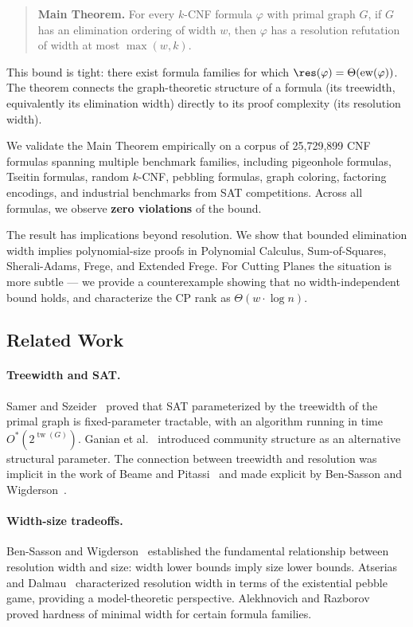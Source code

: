 \documentclass[11pt]{article}
\DeclareMathOperator{\tw}{tw}
\DeclareMathOperator{\ew}{ew}
\begin{document}
\begin{quote}
\textbf{Main Theorem.} For every $k$-CNF formula $\varphi$ with primal graph $G$, if $G$ has an elimination ordering of width $w$, then $\varphi$ has a resolution refutation of width at most $\max(w,k)$.
\end{quote}

This bound is tight: there exist formula families for which $\res(\varphi) = \Theta(\ew(\varphi))$. The theorem connects the graph-theoretic structure of a formula (its treewidth, equivalently its elimination width) directly to its proof complexity (its resolution width).

We validate the Main Theorem empirically on a corpus of 25{,}729{,}899 CNF formulas spanning multiple benchmark families, including pigeonhole formulas, Tseitin formulas, random $k$-CNF, pebbling formulas, graph coloring, factoring encodings, and industrial benchmarks from SAT competitions. Across all formulas, we observe \textbf{zero violations} of the bound.

The result has implications beyond resolution. We show that bounded elimination width implies polynomial-size proofs in Polynomial Calculus, Sum-of-Squares, Sherali-Adams, Frege, and Extended Frege. For Cutting Planes the situation is more subtle --- we provide a counterexample showing that no width-independent bound holds, and characterize the CP rank as $\Theta(w \cdot \log n)$.

\subsection{Related Work}

\paragraph{Treewidth and SAT.} Samer and Szeider~\cite{SS10} proved that SAT parameterized by the treewidth of the primal graph is fixed-parameter tractable, with an algorithm running in time $O^*(2^{\tw(G)})$. Ganian et al.~\cite{ganian2017community} introduced community structure as an alternative structural parameter. The connection between treewidth and resolution was implicit in the work of Beame and Pitassi~\cite{beame1998propositional} and made explicit by Ben-Sasson and Wigderson~\cite{BW01}.

\paragraph{Width-size tradeoffs.} Ben-Sasson and Wigderson~\cite{BW01} established the fundamental relationship between resolution width and size: width lower bounds imply size lower bounds. Atserias and Dalmau~\cite{AD03} characterized resolution width in terms of the existential pebble game, providing a model-theoretic perspective. Alekhnovich and Razborov~\cite{AR02} proved hardness of minimal width for certain formula families.
\end{document}
